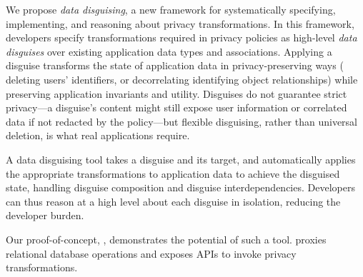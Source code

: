 %
We propose \emph{data disguising}, a new framework
for systematically specifying, implementing, and reasoning about  privacy transformations.
%
In this framework, developers specify transformations required in privacy policies as
high-level \emph{data disguises} over existing application data types and associations.
%
Applying a disguise transforms the state of application data in privacy-preserving ways (\eg
deleting users' identifiers, or decorrelating identifying object relationships) while preserving
application invariants and utility.
%
Disguises do not guarantee strict privacy---a disguise's content might still expose user
information or correlated data if not redacted by the policy---but flexible disguising,
rather than universal deletion, is what real applications require.
%

A data disguising tool takes a disguise and its target, and automatically applies the appropriate
transformations to application data to achieve the disguised state, handling
disguise composition and disguise interdependencies. Developers can
thus reason at a high level about each disguise in isolation, reducing the developer burden.
%

Our proof-of-concept, \sys, demonstrates the potential of such a tool.
%
\sys proxies relational database operations and exposes APIs to invoke privacy transformations.
%

